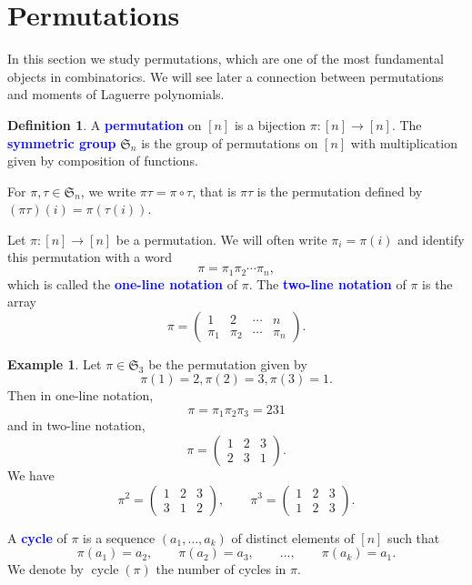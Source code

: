 \documentclass[oneside]{book}
\numberwithin{equation}{section}
\theoremstyle{definition}
\newtheorem{exam}[thm]{Example}
\newtheorem{defn}[thm]{Definition}
\newcommand\cycle{\operatorname{cycle}}
\newcommand\sym{\mathfrak{S}}
\renewcommand\emph[1]{\textcolor{blue}{\bf #1}}
\begin{document}
\section{Permutations}

In this section we study permutations, which are one of the most
fundamental objects in combinatorics. We will see later a connection
between permutations and moments of Laguerre polynomials.

\begin{defn}
  A \emph{permutation} on \( [n] \) is a bijection
  \( \pi:[n] \to [n] \). The \emph{symmetric group} \( \sym_n \) is
  the group of permutations on \( [n] \) with multiplication given by
  composition of functions.
\end{defn}

For \( \pi,\tau\in \sym_n \), we write \( \pi\tau = \pi\circ \tau \),
that is \( \pi\tau \) is the permutation defined by
\( (\pi\tau)(i) = \pi(\tau(i)) \).

Let \( \pi:[n] \to [n] \) be a permutation. We will often write
\( \pi_i = \pi(i) \) and identify this permutation with a word
\[
  \pi = \pi_1\pi_2 \cdots \pi_n,
\]
which is called the \emph{one-line notation} of \( \pi \). The
\emph{two-line notation} of \( \pi \) is the array
\[
\pi = \begin{pmatrix}
1 & 2 & \cdots & n\\
\pi_1 & \pi_2 & \cdots & \pi_n
\end{pmatrix}.
\]

\begin{exam}
  Let \( \pi\in\sym_3 \) be the permutation given by
  \[
    \pi(1) = 2, \pi(2) = 3, \pi(3) =1.
  \]
  Then in one-line notation,
  \[
    \pi = \pi_1\pi_2\pi_3 = 2 3 1
  \]
  and in two-line notation,
  \[
    \pi =
    \begin{pmatrix}
1 & 2 & 3\\
2 & 3 & 1
\end{pmatrix}.
  \]
  We have
  \[
    \pi^2 =
    \begin{pmatrix}
1 & 2 & 3\\
3 & 1 & 2
    \end{pmatrix}, \qquad
        \pi^3 =
    \begin{pmatrix}
1 & 2 & 3\\
1 & 2 & 3
    \end{pmatrix}.
  \]
\end{exam}


A \emph{cycle} of \( \pi \) is a sequence \( (a_1,\dots,a_k) \) of
distinct elements of \( [n] \) such that
\[
  \pi(a_1) = a_2, \qquad  
  \pi(a_2) = a_3, \qquad 
  \ldots, \qquad 
  \pi(a_k) = a_1.
\]
We denote by \( \cycle(\pi) \) the number of cycles in \( \pi \).
\end{document}
